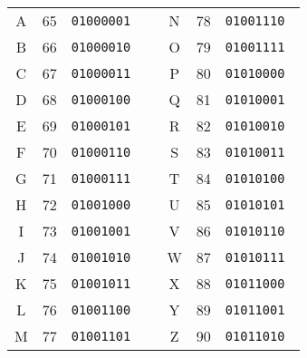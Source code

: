 \documentclass[12pt]{article}
\begin{document}
\begin{center}
\begin{tabular}{|c||c|c|c|c||c|c|}
\hline
A & 65 & \tt{01000001} & & N & 78 & \tt{01001110} \\
B & 66 & \tt{01000010} & & O & 79 & \tt{01001111} \\
C & 67 & \tt{01000011} & & P & 80 & \tt{01010000} \\
D & 68 & \tt{01000100} & & Q & 81 & \tt{01010001} \\
E & 69 & \tt{01000101} & & R & 82 & \tt{01010010} \\
F & 70 & \tt{01000110} & & S & 83 & \tt{01010011} \\
G & 71 & \tt{01000111} & & T & 84 & \tt{01010100} \\
H & 72 & \tt{01001000} & & U & 85 & \tt{01010101} \\
I & 73 & \tt{01001001} & & V & 86 & \tt{01010110} \\
J & 74 & \tt{01001010} & & W & 87 & \tt{01010111} \\
K & 75 & \tt{01001011} & & X & 88 & \tt{01011000} \\
L & 76 & \tt{01001100} & & Y & 89 & \tt{01011001} \\
M & 77 & \tt{01001101} & & Z & 90 & \tt{01011010} \\
\hline
\end{tabular}
\end{center}

\vspace{2em}

\end{document}
